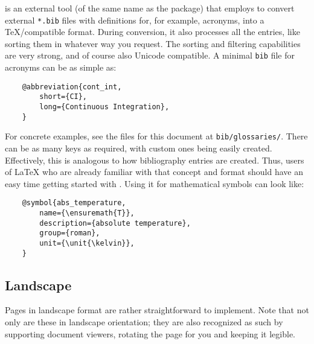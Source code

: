  is an external tool (of the same name as the package) that
 employs to convert external \texttt{*.bib} files with
definitions for, for example, acronyms, into a \TeX{}\-/compatible format.
During conversion, it also processes all the entries, like sorting them in whatever
way you request.
The sorting and filtering capabilities are very strong, and of course also Unicode
compatible.
A minimal \texttt{bib} file for acronyms can be as simple as:
\begin{verbatim}
    @abbreviation{cont_int,
        short={CI},
        long={Continuous Integration},
    }
\end{verbatim}
For concrete examples, see the files for this document at \texttt{bib/glossaries/}.
There can be as many keys as required, with custom ones being easily created.
Effectively, this is analogous to how bibliography entries are created.
Thus, users of \LaTeX{} who are already familiar with that concept and format
should have an easy time getting started with .
Using it for mathematical symbols can look like:
\begin{verbatim}
    @symbol{abs_temperature,
        name={\ensuremath{T}},
        description={absolute temperature},
        group={roman},
        unit={\unit{\kelvin}},
    }
\end{verbatim}

\begin{landscape}
    \section{Landscape}
    
    Pages in landscape format are rather straightforward to implement.
    Note that not only are these in landscape orientation; they are also recognized
    as such by supporting document viewers, rotating the page for you and keeping
    it legible.
\end{landscape}
